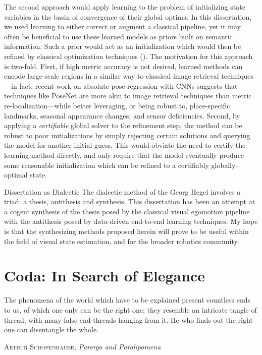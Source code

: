 The second approach would apply learning to the problem of initializing state variables in the basin of convergence of their global optima.  In this dissertation, we used learning to either correct or augment a classical pipeline, yet it may often be beneficial to use these learned models as priors built on semantic information. Such a prior would act as an initialization which would then be refined by classical optimization techniques (). The motivation for this approach is two-fold. First, if high metric accuracy is not desired, learned methods can encode large-scale regions in a similar way to classical image retrieval techniques---in fact, recent work \citep{sattler_understanding_2019} on absolute pose regression with CNNs suggests that techniques like PoseNet are more akin to image retrieval techniques than metric re-localization---while better leveraging, or being robust to, place-specific landmarks, seasonal appearance changes, and sensor deficiencies. Second, by applying a \textit{certifiable} global solver to the refinement step, the method can be robust to poor initializations by simply rejecting certain solutions and querying the model for another initial guess. This would obviate the need to certify the learning method directly, and only require that the model eventually produce some reasonable initialization which can be refined to a certifiably globally-optimal state.
  
\begin{remark}{Dissertation as Dialectic}
The dialectic method of the Georg Hegel involves a triad: a thesis, antithesis and synthesis.
This dissertation has been an attempt at a cogent synthesis of the thesis posed by the classical visual egomotion pipeline with the antithesis posed by data-driven end-to-end learning techniques.
My hope is that the synthesizing methods proposed herein will prove to be useful within the field of visual state estimation, and for the broader robotics community. 
\end{remark}
\newpage
\section{Coda: In Search of Elegance}
\epigraph{The phenomena of the world which have to be explained present countless ends to us, of which one only can be the right one; they resemble an intricate tangle of thread, with many false end-threads hanging from it. He who finds out the right one can disentangle the whole.}{\textsc{Arthur Schopenhauer}, \textit{Parerga and Paralipomena}}

